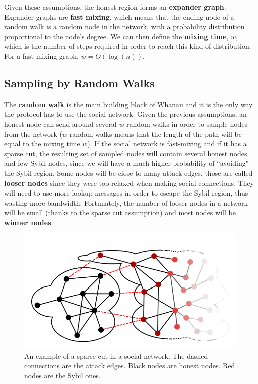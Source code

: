 Given these assumptions, the honest region forms an \textbf{expander graph}. Expander graphs are \textbf{fast mixing}, which means that the ending node of a random walk is a random node in the network, with a probability distribution proportional to the node's degree. We can then define the \textbf{mixing time}, $w$, which is the number of steps required in order to reach this kind of distribution. For a fast mixing graph, $w = O(\log(n))$.

\subsection{Sampling by Random Walks}

The \textbf{random walk} is the main building block of Whanau and it is the only way the protocol has to use the social network. Given the previous assumptions, an honest node can send around several $w$-random walks in order to sample nodes from the network ($w$-random walks means that the length of the path will be equal to the mixing time $w$). If the social network is fast-mixing and if it has a sparse cut, the resulting set of sampled nodes will contain several honest nodes and few Sybil nodes, since we will have a much higher probability of ``avoiding" the Sybil region.
Some nodes will be close to many attack edges, those are called \textbf{looser nodes} since they were too relaxed when making social connections. 
They will need to use more lookup messages in order to escape the Sybil region, thus wasting more bandwidth. Fortunately, the number of looser nodes in a network will be small (thanks to the sparse cut assumption) and most nodes will be \textbf{winner nodes}.

\begin{figure}[h]
    \centering
    \includegraphics[width=\linewidth]{sparse_cut.png}
    \caption{An example of a sparse cut in a social network. The dashed connections are the attack edges. Black nodes are honest nodes. Red nodes are the Sybil ones.}
    \label{fig:sparse_cut}
\end{figure}

